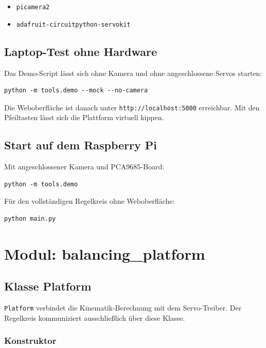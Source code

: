 \documentclass[11pt, a4paper]{scrreprt}
\begin{document}
\begin{itemize}
  \item \texttt{picamera2}
  \item \texttt{adafruit-circuitpython-servokit}
\end{itemize}

\section{Laptop-Test ohne Hardware}

Das Demo-Script lässt sich ohne Kamera und ohne angeschlossene Servos starten:

\begin{lstlisting}
python -m tools.demo --mock --no-camera
\end{lstlisting}

Die Weboberfläche ist danach unter \texttt{http://localhost:5000} erreichbar.
Mit den Pfeiltasten lässt sich die Plattform virtuell kippen.

\section{Start auf dem Raspberry Pi}

Mit angeschlossener Kamera und PCA9685-Board:

\begin{lstlisting}
python -m tools.demo
\end{lstlisting}

Für den vollständigen Regelkreis ohne Weboberfläche:

\begin{lstlisting}
python main.py
\end{lstlisting}

\chapter{Modul: balancing\_platform}

\section{Klasse Platform}

\texttt{Platform} verbindet die Kinematik-Berechnung mit dem Servo-Treiber.
Der Regelkreis kommuniziert ausschließlich über diese Klasse.

\subsection*{Konstruktor}
\end{document}

